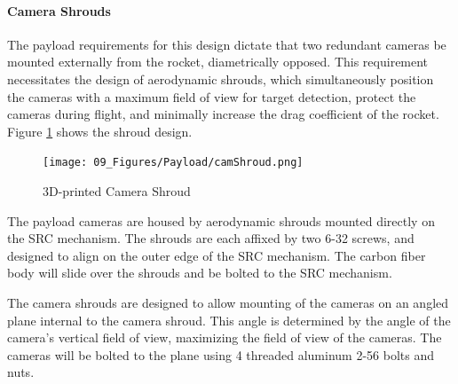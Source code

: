 \documentclass[class=article, crop=false]{standalone}
\begin{document}
	
	\paragraph{Camera Shrouds}
	\label{paragraph:shroud_design}
	
	The payload requirements for this design dictate that two redundant cameras be mounted externally from the rocket, diametrically opposed. This requirement necessitates the design of aerodynamic shrouds, which simultaneously position the cameras with a maximum field of view for target detection, protect the cameras during flight, and minimally increase the drag coefficient of the rocket. Figure \ref{fig:shroudINTHEREAL} shows the shroud design.
	
	\bigbreak
	
	
	\FloatBarrier
	\begin{figure}[h]
		\centering
		\texttt{[image: 09\_Figures/Payload/camShroud.png]}
		\caption{3D-printed Camera Shroud}
		\label{fig:shroudINTHEREAL}
	\end{figure}
	\FloatBarrier
	
	The payload cameras are housed by aerodynamic shrouds mounted directly on the SRC mechanism. The shrouds are each affixed by two 6-32 screws, and designed to align on the outer edge of the SRC mechanism. The carbon fiber body will slide over the shrouds and be bolted to the SRC mechanism.
	
	
	\bigbreak
	The camera shrouds are designed to allow mounting of the cameras on an angled plane internal to the camera shroud. This angle is determined by the angle of the camera's vertical field of view, maximizing the field of view of the cameras. The cameras will be bolted to the plane using 4 threaded aluminum 2-56 bolts and nuts.
	
	\bigbreak
	
\end{document}
